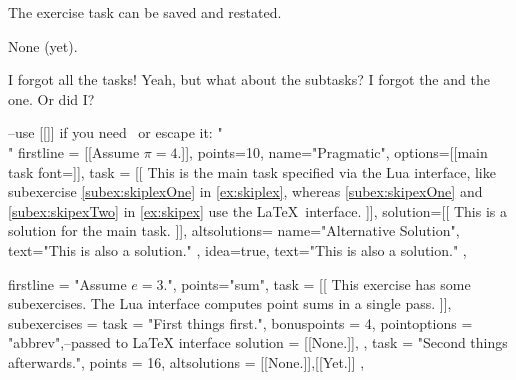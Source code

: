 \ifbeamer{\documentclass{beamer}}{\documentclass[a5paper]{article}}
\begin{document}
\begin{sheet}[date={Novanuar 21, -2022}]
  \begin{exercise}[points={many, many},savetasks,
    main task font={\tiny},subtask font={\itshape}
  ]
    \begin{maintask}
      The exercise task can be saved and restated.
    \end{maintask}
    \begin{subtasks}
      \begin{solution}[framed]
        None (yet).
      \end{solution}
    \end{subtasks}
    I forgot all the tasks!
    \restatetask
    Yeah, but what about the subtasks? I forgot the \restatetask[1] and the \restatetask[2] one. Or did I?
  \end{exercise}

  \begin{Lexercise}
    --use [[]] if you need \ or escape it: "\\"
    firstline = [[Assume $\pi=4$.]],
    points=10,
    name="Pragmatic",
    options=[[main task font={\itshape}]],
    task  = [[
      This is the main task specified via the Lua
      interface, like subexercise \ref{subex:skiplexOne} in \ref{ex:skiplex}, whereas \ref{subex:skipexOne}
      and \ref{subex:skipexTwo} in
      \ref{ex:skipex} use the \LaTeX~interface.
    ]],
    solution=[[
      This is a solution for the main task.
    ]],
    altsolutions={
      {
        name="Alternative Solution",
        text="This is also a solution."
      },{
        idea=true,
        text="This is also a solution."
      }
    },
  \end{Lexercise}

  \begin{Lexercise}
    firstline = "Assume $e=3$.",
    points="sum",
    task  = [[
      This exercise has some subexercises. The Lua interface
      computes point sums in a single pass.
    ]],
    subexercises = {
      {
        task = "First things first.",
        bonuspoints = 4,
        pointoptions = "abbrev",--passed to LaTeX interface
        solution = [[None.]],
      },{
        task = "Second things afterwards.",
        points = 16,
        altsolutions = { [[None.]],[[Yet.]] },
      }
    }
  \end{Lexercise}

\end{sheet}
\end{document}
